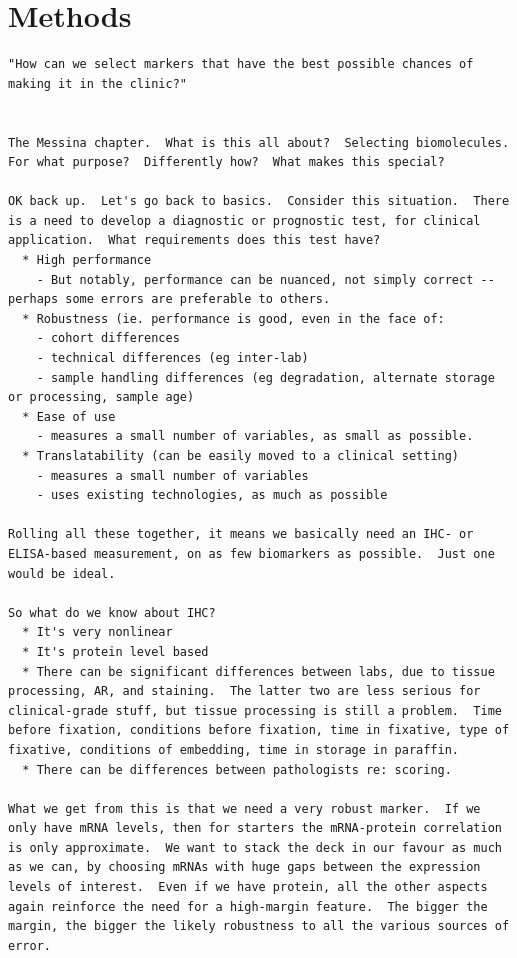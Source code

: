 \documentclass[dissertation.tex]{subfiles}
\begin{document}
\section{Methods}


\begin{verbatim}
"How can we select markers that have the best possible chances of making it in the clinic?"


The Messina chapter.  What is this all about?  Selecting biomolecules.  For what purpose?  Differently how?  What makes this special?

OK back up.  Let's go back to basics.  Consider this situation.  There is a need to develop a diagnostic or prognostic test, for clinical application.  What requirements does this test have?
  * High performance
    - But notably, performance can be nuanced, not simply correct -- perhaps some errors are preferable to others.
  * Robustness (ie. performance is good, even in the face of:
    - cohort differences
    - technical differences (eg inter-lab)
    - sample handling differences (eg degradation, alternate storage or processing, sample age)
  * Ease of use
    - measures a small number of variables, as small as possible.
  * Translatability (can be easily moved to a clinical setting)
    - measures a small number of variables
    - uses existing technologies, as much as possible

Rolling all these together, it means we basically need an IHC- or ELISA-based measurement, on as few biomarkers as possible.  Just one would be ideal.

So what do we know about IHC?
  * It's very nonlinear
  * It's protein level based
  * There can be significant differences between labs, due to tissue processing, AR, and staining.  The latter two are less serious for clinical-grade stuff, but tissue processing is still a problem.  Time before fixation, conditions before fixation, time in fixative, type of fixative, conditions of embedding, time in storage in paraffin.
  * There can be differences between pathologists re: scoring.

What we get from this is that we need a very robust marker.  If we only have mRNA levels, then for starters the mRNA-protein correlation is only approximate.  We want to stack the deck in our favour as much as we can, by choosing mRNAs with huge gaps between the expression levels of interest.  Even if we have protein, all the other aspects again reinforce the need for a high-margin feature.  The bigger the margin, the bigger the likely robustness to all the various sources of error.


\end{verbatim}
\end{document}
